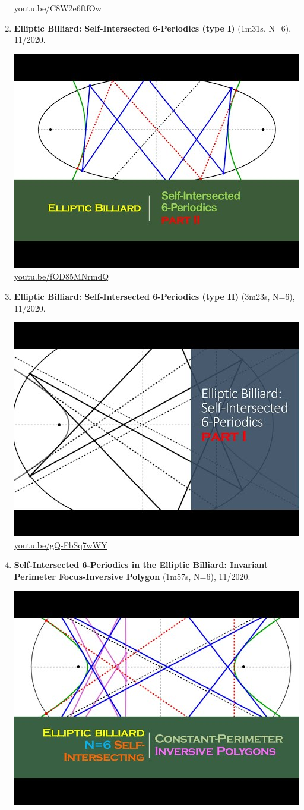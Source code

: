 \documentclass[12pt]{amsart}
\begin{document}
\begin{enumerate}[resume]
\begin{center}
\href{https://youtu.be/C8W2e6ftfOw}{\url{youtu.be/C8W2e6ftfOw}}\end{center}
% 
\item \textbf{Elliptic Billiard: Self-Intersected 6-Periodics (type I)} (1m31s, N=6), 11/2020. 
\begin{center}\includegraphics[width=.5\textwidth]{pics/fOD85MNrmdQ.jpg} \\ 
\href{https://youtu.be/fOD85MNrmdQ}{\url{youtu.be/fOD85MNrmdQ}}\end{center}
% 
\item \textbf{Elliptic Billiard: Self-Intersected 6-Periodics (type II)} (3m23s, N=6), 11/2020. 
\begin{center}\includegraphics[width=.5\textwidth]{pics/gQ-FbSq7wWY.jpg} \\ 
\href{https://youtu.be/gQ-FbSq7wWY}{\url{youtu.be/gQ-FbSq7wWY}}\end{center}
% 
\item \textbf{Self-Intersected 6-Periodics in the Elliptic Billiard: Invariant Perimeter Focus-Inversive Polygon} (1m57s, N=6), 11/2020. 
\begin{center}\includegraphics[width=.5\textwidth]{pics/7lXwjXj-8YY.jpg} \\ 

\end{center}
\end{enumerate}
\end{document}
